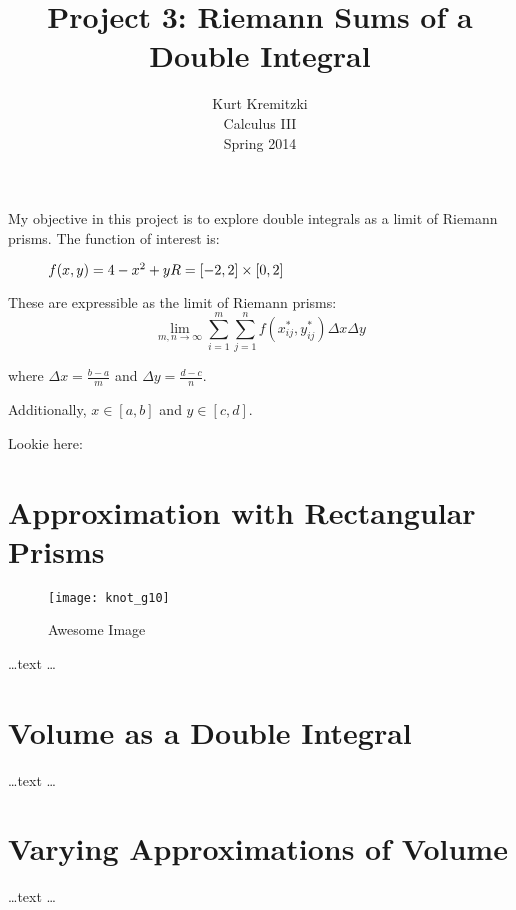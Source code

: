 \documentclass{article}
\begin{document}
\title{Project 3: Riemann Sums of a Double Integral}
\author{Kurt Kremitzki\\
        Calculus III\\
        Spring 2014}
\maketitle

My objective in this project is to explore double integrals as a limit of Riemann prisms. The function of interest is:

\begin{figure}[h]
$f(x,y) = 4 - x^2 + y
\hfill R = [-2,2] \times [0,2]$
\end{figure}

These are expressible as the limit of Riemann prisms:
\begin{equation}
    \lim_{m,n \to \infty} \sum_{i=1}^{m} \sum_{j=1}^{n} f(x_{ij}^{ *}, y_{ij}^{ *}) \Delta x \Delta y
\end{equation}

where $\Delta x = \frac{b-a}{m}$ and $\Delta y = \frac{d - c}{n}$.

Additionally, $x \in [a, b]$ and $y \in [c, d]$.

Lookie here:

\section{Approximation with Rectangular Prisms}
\begin{SCfigure}
    \centering
    \texttt{[image: knot\_g10]}
    \caption{Awesome Image}
\end{SCfigure}

    \ldots text \ldots

\section{Volume as a Double Integral}
    \ldots text \ldots

\section{Varying Approximations of Volume}
    \ldots text \ldots
\end{document}
